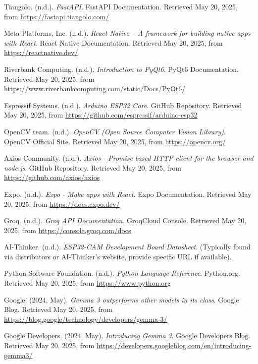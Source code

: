 \documentclass[12pt, a4paper]{report}
\begin{document}
\cleardoublepage
\begin{thebibliography}{99}
    Tiangolo. (n.d.). \textit{FastAPI}. FastAPI Documentation. Retrieved May 20, 2025, from \url{https://fastapi.tiangolo.com/}

    Meta Platforms, Inc. (n.d.). \textit{React Native – A framework for building native apps with React}. React Native Documentation. Retrieved May 20, 2025, from \url{https://reactnative.dev/}

    Riverbank Computing. (n.d.). \textit{Introduction to PyQt6}. PyQt6 Documentation. Retrieved May 20, 2025, from \url{https://www.riverbankcomputing.com/static/Docs/PyQt6/}

    Espressif Systems. (n.d.). \textit{Arduino ESP32 Core}. GitHub Repository. Retrieved May 20, 2025, from \url{https://github.com/espressif/arduino-esp32}

    OpenCV team. (n.d.). \textit{OpenCV (Open Source Computer Vision Library)}. OpenCV Official Site. Retrieved May 20, 2025, from \url{https://opencv.org/}
    
    Axios Community. (n.d.). \textit{Axios - Promise based HTTP client for the browser and node.js}. GitHub Repository. Retrieved May 20, 2025, from \url{https://github.com/axios/axios}

    Expo. (n.d.). \textit{Expo - Make apps with React}. Expo Documentation. Retrieved May 20, 2025, from \url{https://docs.expo.dev/}

    Groq. (n.d.). \textit{Groq API Documentation}. GroqCloud Console. Retrieved May 20, 2025, from \url{https://console.groq.com/docs}

    AI-Thinker. (n.d.). \textit{ESP32-CAM Development Board Datasheet}. (Typically found via distributors or AI-Thinker's website, provide specific URL if available).

    Python Software Foundation. (n.d.). \textit{Python Language Reference}. Python.org. Retrieved May 20, 2025, from \url{https://www.python.org}
    
    
    Google. (2024, May). \textit{Gemma 3 outperforms other models in its class}. Google Blog. Retrieved May 20, 2025, from \url{https://blog.google/technology/developers/gemma-3/}

    Google Developers. (2024, May). \textit{Introducing Gemma 3}. Google Developers Blog. Retrieved May 20, 2025, from \url{https://developers.googleblog.com/en/introducing-gemma3/}
\end{thebibliography}
\end{document}
